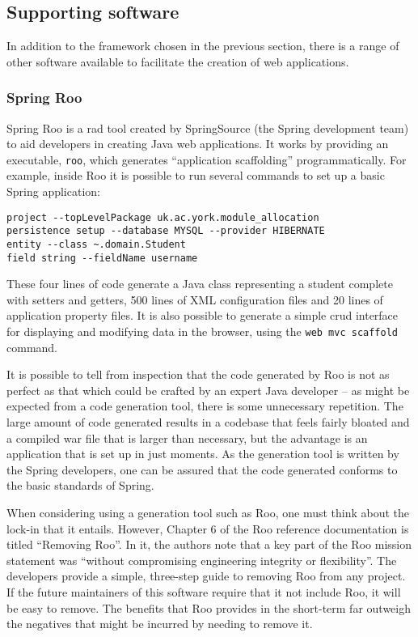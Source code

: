 
\subsection{Supporting software}

In addition to the framework chosen in the previous section, there is a range
of other software available to facilitate the creation of web applications.

\subsubsection{Spring Roo}

Spring Roo is a \gls{rad} tool created by SpringSource (the Spring development
team) to aid developers in creating Java web applications. It works by
providing an executable, \texttt{roo}, which generates ``application
scaffolding'' programmatically. For example, inside Roo it is possible to run
several commands to set up a basic Spring application:

\begin{lstlisting}
project --topLevelPackage uk.ac.york.module_allocation
persistence setup --database MYSQL --provider HIBERNATE
entity --class ~.domain.Student
field string --fieldName username
\end{lstlisting}

These four lines of code generate a Java class representing a student complete
with setters and getters, 500 lines of XML configuration files and 20 lines of
application property files. It is also possible to generate a simple
\gls{crud} interface for displaying and modifying data in the browser, using
the \texttt{web mvc scaffold} command.

It is possible to tell from inspection that the code generated by Roo is not
as perfect as that which could be crafted by an expert Java developer -- as
might be expected from a code generation tool, there is some unnecessary
repetition. The large amount of code generated results in a codebase that
feels fairly bloated and a compiled \gls{war} file that is larger than
necessary, but the advantage is an application that is set up in just moments.
As the generation tool is written by the Spring developers, one can be assured
that the code generated conforms to the basic standards of Spring.

When considering using a generation tool such as Roo, one must think about the
lock-in that it entails. However, Chapter 6 of the Roo reference documentation
\cite{RooReferenceDocs2011} is titled ``Removing Roo''. In it, the authors
note that a key part of the Roo mission statement was ``without compromising
engineering integrity or flexibility''. The developers provide a simple,
three-step guide to removing Roo from any project. If the future maintainers
of this software require that it not include Roo, it will be easy to remove.
The benefits that Roo provides in the short-term far outweigh the negatives
that might be incurred by needing to remove it.

